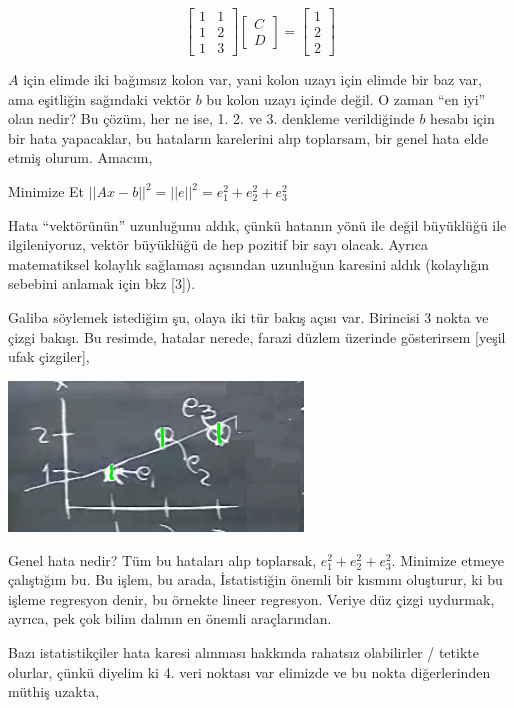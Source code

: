 \documentclass[12pt,fleqn]{article}\usepackage{../../common}
\begin{document}
$$ 
\left[\begin{array}{rrr}
1 & 1 \\
1 & 2 \\
1 & 3
\end{array}\right]
\left[\begin{array}{rrr}
C \\
D
\end{array}\right]
=
\left[\begin{array}{rrr}
1 \\
2 \\
2 
\end{array}\right]
 $$

$A$ için elimde iki bağımsız kolon var, yani kolon uzayı için elimde bir
baz var, ama eşitliğin sağındaki vektör $b$ bu kolon uzayı içinde değil. O
zaman ``en iyi'' olan nedir? Bu çözüm, her ne ise, 1. 2. ve 3. denkleme
verildiğinde $b$ hesabı için bir hata yapacaklar, bu hataların karelerini
alıp toplarsam, bir genel hata elde etmiş olurum. Amacım, 

Minimize Et $||Ax-b||^2 = ||e||^2 = e_1^2+e_2^2+e_3^2$

Hata ``vektörünün'' uzunluğunu aldık, çünkü hatanın yönü ile değil
büyüklüğü ile ilgileniyoruz, vektör büyüklüğü de hep pozitif bir sayı
olacak. Ayrıca matematiksel kolaylık sağlaması açısından uzunluğun karesini
aldık (kolaylığın sebebini anlamak için bkz [3]).

Galiba söylemek istediğim şu, olaya iki tür bakış açısı var. Birincisi 3
nokta ve çizgi bakışı. Bu resimde, hatalar nerede, farazi düzlem
üzerinde gösterirsem [yeşil ufak çizgiler],

\includegraphics[height=4cm]{16_3.png}

Genel hata nedir? Tüm bu hataları alıp toplarsak, $e_1^2 + e_2^2 +
e_3^2$. Minimize etmeye çalıştığım bu. Bu işlem, bu arada, İstatistiğin
önemli bir kısmını oluşturur, ki bu işleme regresyon denir, bu örnekte
lineer regresyon. Veriye düz çizgi uydurmak, ayrıca, pek çok bilim dalının
en önemli araçlarından.

Bazı istatistikçiler hata karesi alınması hakkında rahatsız olabilirler /
tetikte olurlar, çünkü diyelim ki 4. veri noktası var elimizde ve bu nokta
diğerlerinden müthiş uzakta,
\end{document}
